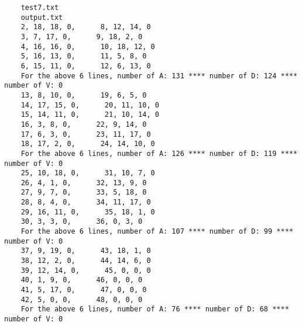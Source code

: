 \documentclass[]{article}
\begin{document}
	\begin{lstlisting}
	test7.txt
	output.txt
	2, 18, 18, 0,      8, 12, 14, 0
	3, 7, 17, 0,      9, 18, 2, 0
	4, 16, 16, 0,      10, 18, 12, 0
	5, 16, 13, 0,      11, 5, 8, 0
	6, 15, 11, 0,      12, 6, 13, 0
	For the above 6 lines, number of A: 131 **** number of D: 124 **** number of V: 0
	13, 8, 10, 0,      19, 6, 5, 0
	14, 17, 15, 0,      20, 11, 10, 0
	15, 14, 11, 0,      21, 10, 14, 0
	16, 3, 8, 0,      22, 9, 14, 0
	17, 6, 3, 0,      23, 11, 17, 0
	18, 17, 2, 0,      24, 14, 10, 0
	For the above 6 lines, number of A: 126 **** number of D: 119 **** number of V: 0
	25, 10, 18, 0,      31, 10, 7, 0
	26, 4, 1, 0,      32, 13, 9, 0
	27, 9, 7, 0,      33, 5, 18, 0
	28, 8, 4, 0,      34, 11, 17, 0
	29, 16, 11, 0,      35, 18, 1, 0
	30, 3, 3, 0,      36, 0, 3, 0
	For the above 6 lines, number of A: 107 **** number of D: 99 **** number of V: 0
	37, 9, 19, 0,      43, 18, 1, 0
	38, 12, 2, 0,      44, 14, 6, 0
	39, 12, 14, 0,      45, 0, 0, 0
	40, 1, 9, 0,      46, 0, 0, 0
	41, 5, 17, 0,      47, 0, 0, 0
	42, 5, 0, 0,      48, 0, 0, 0
	For the above 6 lines, number of A: 76 **** number of D: 68 **** number of V: 0

	\end{lstlisting}
\end{document}
